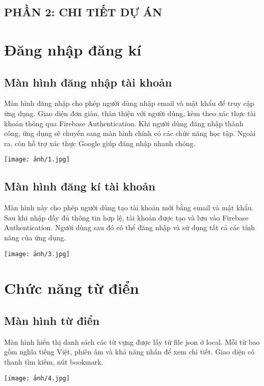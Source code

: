 \begin{center}
\section*{PHẦN 2: CHI TIẾT DỰ ÁN}
\end{center}

\section{Đăng nhập đăng kí}
\subsection{Màn hình đăng nhập tài khoản}
Màn hình đăng nhập cho phép người dùng nhập email và mật khẩu để truy cập ứng dụng. Giao diện đơn giản, thân thiện với người dùng, kèm theo xác thực tài khoản thông qua Firebase Authentication. Khi người dùng đăng nhập thành công, ứng dụng sẽ chuyển sang màn hình chính có các chức năng học tập. Ngoài ra, còn hỗ trợ xác thực Google giúp đăng nhập nhanh chóng.
\begin{center}
\texttt{[image: ảnh/1.jpg]}
\end{center}
 

\subsection{Màn hình đăng kí tài khoản}
Màn hình này cho phép người dùng tạo tài khoản mới bằng email và mật khẩu. Sau khi nhập đầy đủ thông tin hợp lệ, tài khoản được tạo và lưu vào Firebase Authentication. Người dùng sau đó có thể đăng nhập và sử dụng tất cả các tính năng của ứng dụng.
\begin{center}
\texttt{[image: ảnh/3.jpg]}
\end{center}

\section{Chức năng từ điển}
\subsection{Màn hình từ điển}
Màn hình hiển thị danh sách các từ vựng được lấy từ file json ở local. Mỗi từ bao gồm nghĩa tiếng Việt, phiên âm và khả năng nhấn để xem chi tiết. Giao diện có thanh tìm kiếm, nút bookmark.
\begin{center}
\texttt{[image: ảnh/4.jpg]}
\end{center}

